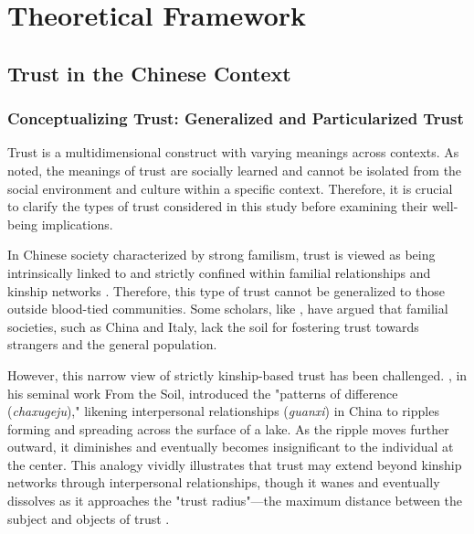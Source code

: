 \section{Theoretical Framework}
\label{sec:ch4-theoretical-framework}

\subsection{Trust in the Chinese Context}

\subsubsection{Conceptualizing Trust: Generalized and Particularized Trust}

Trust is a multidimensional construct with varying meanings across contexts. As \textcite{barberLogicLimitsTrust1983}noted, the meanings of trust are socially learned and cannot be isolated from the social environment and culture within a specific context. Therefore, it is crucial to clarify the types of trust considered in this study before examining their well-being implications.

In Chinese society characterized by strong familism, trust is viewed as being intrinsically linked to and strictly confined within familial relationships and kinship networks \parencite{weberReligionChinaConfucianism1968,yanIntergenerationalIntimacyDescending2016,yanChineseFamiliesUpside2021}. Therefore, this type of trust cannot be generalized to those outside blood-tied communities. Some scholars, like \textcite{fukuyamaTrustSocialVirtues1996}, have argued that familial societies, such as China and Italy, lack the soil for fostering trust towards strangers and the general population.

However, this narrow view of strictly kinship-based trust has been challenged. \textcite{feiSoilFoundationsChinese1992}, in his seminal work From the Soil, introduced the "patterns of difference (\textit{chaxugeju})," likening interpersonal relationships (\textit{guanxi}) in China to ripples forming and spreading across the surface of a lake. As the ripple moves further outward, it diminishes and eventually becomes insignificant to the individual at the center. This analogy vividly illustrates that trust may extend beyond kinship networks through interpersonal relationships, though it wanes and eventually dissolves as it approaches the "trust radius"—the maximum distance between the subject and objects of trust \parencite{liParticularizedTrustGeneralized2002}.

